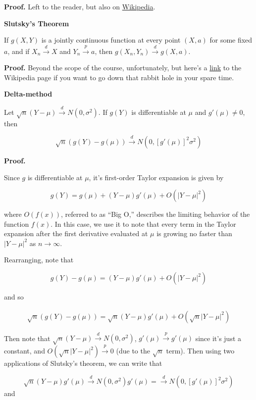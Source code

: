 \documentclass[
  letterpaper,
  DIV=11,
  numbers=noendperiod]{scrreprt}
\begin{document}
\textbf{Proof.} Left to the reader, but also on
\href{https://en.wikipedia.org/wiki/Continuous_mapping_theorem\#Proof}{Wikipedia}.

\textbf{Slutsky's Theorem}

If \(g(X, Y)\) is a jointly continuous function at every point
\((X, a)\) for some fixed \(a\), and if \(X_n \overset{d}{\to} X\) and
\(Y_n \overset{p}{\to} a\), then
\(g(X_n, Y_n) \overset{d}{\to} g(X, a)\).

\textbf{Proof.} Beyond the scope of the course, unfortunately, but
here's a
\href{https://en.wikipedia.org/wiki/Slutsky\%27s_theorem\#Proof}{link}
to the Wikipedia page if you want to go down that rabbit hole in your
spare time.

\textbf{Delta-method}

Let \(\sqrt{n} (Y - \mu) \overset{d}{\to} N(0, \sigma^2)\). If \(g(Y)\)
is differentiable at \(\mu\) and \(g'(\mu) \neq 0\), then

\[
\sqrt{n} \left( g(Y) - g(\mu)\right) \overset{d}{\to} N(0, [g'(\mu)]^2 \sigma^2)
\]

\textbf{Proof.}

Since \(g\) is differentiable at \(\mu\), it's first-order Taylor
expansion is given by

\[
g(Y) = g(\mu) + (Y - \mu)g'(\mu) + O(| Y - \mu |^2)
\]

where \(O(f(x))\), referred to as ``Big O,'' describes the limiting
behavior of the function \(f(x)\). In this case, we use it to note that
every term in the Taylor expansion after the first derivative evaluated
at \(\mu\) is growing no faster than \(|Y - \mu|^2\) as
\(n \to \infty\).

Rearranging, note that

\[
g(Y) - g(\mu) =  (Y - \mu)g'(\mu) + O(| Y - \mu |^2)
\]

and so

\begin{align*}
    \sqrt{n}\left( g(Y) - g(\mu) \right) = \sqrt{n}(Y - \mu) g'(\mu) + O(\sqrt{n} |Y - \mu|^2)
\end{align*}

Then note that \(\sqrt{n}(Y - \mu) \overset{d}{\to} N(0, \sigma^2)\),
\(g'(\mu) \overset{p}{\to} g'(\mu)\) since it's just a constant, and
\(O(\sqrt{n} |Y - \mu|^2) \overset{p}{\to} 0\) (due to the \(\sqrt{n}\)
term). Then using two applications of Slutsky's theorem, we can write
that

\[
\sqrt{n}(Y - \mu)g'(\mu) \overset{d}{\to} N(0, \sigma^2)g'(\mu) = \overset{d}{\to} N(0, [g'(\mu)]^2\sigma^2)
\] and
\end{document}
